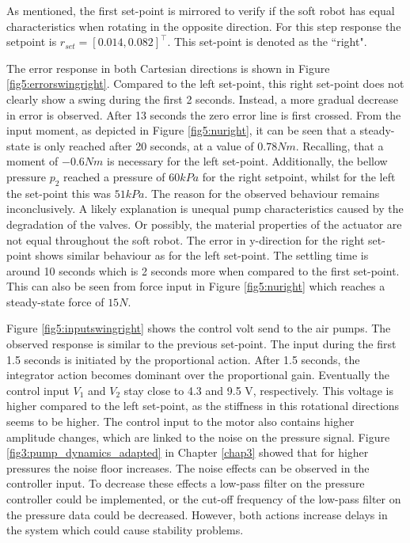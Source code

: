 As mentioned, the first set-point is mirrored to verify if the soft robot has equal characteristics when rotating in the opposite direction. For this step response the setpoint is $r_{set} = [0.014,0.082]^\top$. This set-point is denoted as the ``right".


The error response in both Cartesian directions is shown in Figure \ref{fig5:errorswingright}. Compared to the left set-point, this right set-point does not clearly show a swing during the first 2 seconds. Instead, a more gradual decrease in error is observed. After 13 seconds the zero error line is first crossed. From the input moment, as depicted in Figure \ref{fig5:nuright}, it can be seen that a steady-state is only reached after 20 seconds, at a value of $0.78 Nm$. Recalling, that a moment of $-0.6 Nm$ is necessary for the left set-point. Additionally, the bellow pressure $p_2$ reached a pressure of $60 kPa$ for the right setpoint, whilst for the left the set-point this was $51 kPa$. The reason for the observed behaviour remains inconclusively. A likely explanation is unequal pump characteristics caused by the degradation of the valves. Or possibly, the material properties of the actuator are not equal throughout the soft robot. The error in y-direction for the right set-point shows similar behaviour as for the left set-point. The settling time is around 10 seconds which is 2 seconds more when compared to the first set-point. This can also be seen from force input in Figure \ref{fig5:nuright} which reaches a steady-state force of $15 N$.

Figure \ref{fig5:inputswingright} shows the control volt send to the air pumps. The observed response is similar to the previous set-point. The input during the first 1.5 seconds is initiated by the proportional action. After 1.5 seconds, the integrator action becomes dominant over the proportional gain. Eventually the control input $V_1$ and $V_2$ stay close to 4.3 and 9.5 V, respectively. This voltage is higher compared to the left set-point, as the stiffness in this rotational directions seems to be higher. The control input to the motor also contains higher amplitude changes, which are linked to the noise on the pressure signal. Figure \ref{fig3:pump_dynamics_adapted} in Chapter \ref{chap3} showed that for higher pressures the noise floor increases. The noise effects can be observed in the controller input. To decrease these effects a low-pass filter on the pressure controller could be implemented, or the cut-off frequency of the low-pass filter on the pressure data could be decreased. However, both actions increase delays in the system which could cause stability problems.

